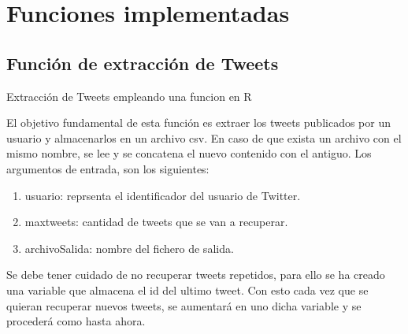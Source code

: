 
\chapter{Funciones implementadas}
\label{cha:funciones}

\section{Función de extracción de Tweets}
\label{sec:funcion-extraccion}

\begin{codefloat}

\caption{Extracción de Tweets empleando una funcion en R}
\label{cod:extraccion}
\end{codefloat}

El objetivo fundamental de esta función es extraer los tweets publicados por un usuario y almacenarlos 
en un archivo csv. En caso de que exista un archivo con el mismo nombre, se lee y se concatena el 
nuevo contenido con el antiguo. Los argumentos de entrada, son los siguientes:

\begin{enumerate}

\item usuario: reprsenta el identificador del usuario de Twitter.
\item maxtweets: cantidad de tweets que se van a recuperar.
\item archivoSalida: nombre del fichero de salida.

\end{enumerate}

Se debe tener cuidado de no recuperar tweets repetidos, para ello se ha creado una variable que almacena 
el id del ultimo tweet. Con esto cada vez que se quieran recuperar nuevos tweets, se aumentará en 
uno dicha variable y se procederá como hasta ahora.



